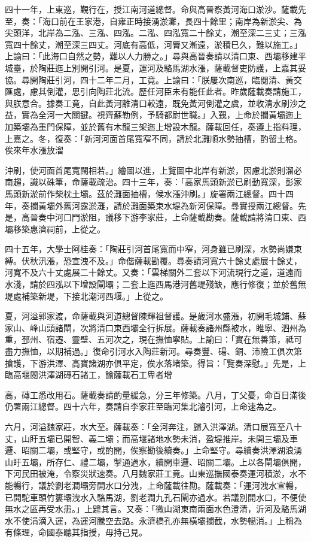 \begin{pinyinscope}
四十一年，上東巡，覲行在，授江南河道總督。命與高晉察黃河海口淤沙。薩載先至，奏：「海口前在王家港，自雍正時接湧淤灘，長四十餘里；南岸為新淤尖、為尖頭洋，北岸為二泓、三泓、四泓。二泓、四泓寬二十餘丈，潮至深二三丈；三泓寬四十餘丈，潮至深三四丈。河底有高低，河脣又漸遠，淤積巳久，難以施工。」上諭曰：「此海口自然之勢，難以人力勝之。」尋與高晉奏請以清口東、西壩移建平城臺，於陶莊迤上別開引河。是夏，運河及駱馬湖水漲，薩載督吏防護，上嘉其妥協。尋開陶莊引河，四十二年二月，工竟。上諭曰：「朕屢次南巡，臨閱清、黃交匯處，慮其倒灌，思引向陶莊北流。歷任河臣未有能任此者。昨歲薩載奏請施工，與朕意合。據奏工竟，自此黃河離清口較遠，既免黃河倒灌之虞，並收清水刷沙之益，實為全河一大關鍵。視齊蘇勒例，予騎都尉世職。」入覲，上命於攔黃壩迤上加築壩為重門保障，並於舊有木龍三架迤上增設木龍。薩載回任，奏遵上指料理，上嘉之。冬，復奏：「新河河面首尾寬窄不同，請於北灘順水勢抽槽，酌留土格。俟來年水漲放溜

沖刷，使河面首尾寬闊相若。」繪圖以進，上覽圖中北岸有新淤，因慮北淤則溜必南趨，識以硃筆，命薩載疏治。四十三年，奏：「高家馬頭新淤已刷動寬深，彭家馬頭新淤前作柴枕土壩。茲於灘面抽槽，候水漲沖刷。」旋署兩江總督。四十四年，奏攔黃壩外舊河露淤灘，請於灘面築束水堤為新河保障。尋實授兩江總督。先是，高晉奏中河口門淤阻，議移下游李家莊，上命薩載勘奏。薩載請將清口東、西壩移築惠濟祠前，上從之。

四十五年，大學士阿桂奏：「陶莊引河首尾寬而中窄，河身雖已刷深，水勢尚嫌束縛。伏秋汛漲，恐宣洩不及。」命偕薩載勘覆。尋奏請河寬六十餘丈處展十餘丈，河寬不及六十丈處展二十餘丈。又奏：「雲梯關外二套以下河流現行之道，道遠而水淺，請於四泓以下增設閘壩；二套上迤西馬港河舊堤殘缺，應行修復；並於舊無堤處補築新堤，下接北潮河西堰。」上從之。

夏，河溢郭家渡，命薩載與河道總督陳輝祖督護。是歲河水盛漲，初開毛城鋪、蘇家山、峰山頭諸閘，次將清口東西壩全行拆展。薩載奏諸州縣被水，睢寧、泗州為重，邳州、宿遷、靈壁、五河次之，現在撫恤寧貼。上諭曰：「實在無善策，祗可盡力撫恤，以期補過。」復命引河水入陶莊新河。尋奏豐、碭、銅、沛險工俱次第搶護，下游洪澤、高寶諸湖亦俱平定，俟水落堵築。得旨：「覽奏深慰。」先是，上臨高堰閱洪澤湖磚石諸工，諭薩載石工卑者增

高，磚工悉改用石。薩載奏請酌量緩急，分三年修築。八月，丁父憂，命百日滿後仍署兩江總督。四十六年，奏請自李家莊至臨河集北濬引河，上命速為之。

六月，河溢魏家莊，水大至。薩載奏：「全河奔注，歸入洪澤湖。清口展寬至八十丈，山盱五壩已開智、義二壩；而高堰諸地水勢未消，盈堤推岸。未開三壩及車邏、昭關二壩，或堅守，或酌開，俟察勘後續奏。」上命堅守。尋續奏洪澤湖浪湧山盱五壩，所存仁、禮二壩，掣通過水，續開車邏、昭關二壩。上以各閘壩俱開，下河民田被淹，令察災狀速奏。八月魏家莊工竟。山東巡撫國泰奏運河積淤，水不能暢行，議於劉老澗壩旁開水口分洩，上命薩載往勘。薩載奏：「運河洩水宣暢，已開駝車頭竹簍壩洩水入駱馬湖，劉老澗九孔石閘亦過水。若議別開水口，不便使無水之區再受水患。」上韙其言。又奏：「微山湖東南兩面水色澄清，沂河及駱馬湖水不使涓滴入運，為運河騰空去路。永濟橋孔亦無橫壩攔截，水勢暢消。」上稱為有條理，命國泰聽其指授，毋持己見。


\end{pinyinscope}
